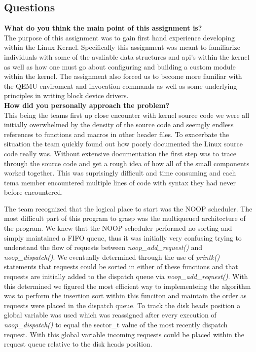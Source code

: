 \documentclass[10pt,onecolumn,draftclsnofoot]{IEEEtran} %
\begin{document}
\begin{singlespace}
\newpage
\section{\bf Questions}
	
	\textbf{What do you think the main point of this assignment is?}\\
		
		\normalfont \indent The purpose of this assignment was to gain first hand experience developing within the Linux Kernel. Specifically this assignment was meant to familiarize individuals with some of the avaliable data structures and api's within the kernel as well as how one must go about configuring and building a custom module within the kernel. The assignment also forced us to become more familiar with the QEMU enviroment and invocation commands as well as some underlying principles in writing block device drivers.\\
	
	\textbf{How did you personally approach the problem?}\\
	
		\normalfont \indent This being the teams first up close encounter with kernel source code we were all initially overwhelmed by the density of the source code and seemgly endless references to functions and macros in other header files. To exacerbate the situation the team quickly found out how poorly documented the Linux source code really was. Without extensive documentation the first step was to trace through the source code and get a rough idea of how all of the small components worked together. This was suprisingly difficult and time consuming and each tema member encountered multiple lines of code with syntax they had never before encountered. 
	
		\normalfont \indent The team recognized that the logical place to start was the NOOP scheduler. The most difficult part of this program to grasp was the multiqueued architecture of the program. We knew that the NOOP scheduler performed no sorting and simply maintained a FIFO queue, thus it was initially very confusing trying to understand the flow of requests between \textit{noop\_add\_request()} and \textit{noop\_dispatch()}. We eventually determined through the use of \textit{printk()} statements that requests could be sorted in either of these functions and that requests are initially added to the dispatch queue via \textit{noop\_add\_request()}. With this determined we figured the most efficient way to implementeing the algorithm was to perform the insertion sort within this funciton and maintain the order as requests were placed in the dispatch queue. To track the disk heads position a global variable was used which was reassigned after every execution of \textit{noop\_dispatch()} to equal the sector\_t value of the most recently dispatch request. With this global variable incoming requests could be placed within the request queue relative to the disk heads position.\\



\end{singlespace}
\end{document}
